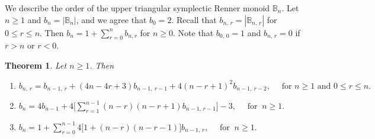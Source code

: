 \documentclass[11pt]{article}
\newtheorem{theorem}{Theorem}[section]
\newcommand{\q}{\quad}
\newcommand{\ges}{\geqslant}
\newcommand{\les}{\leqslant}
\begin{document}
We describe the order of the upper triangular symplectic Renner monoid $\mathbb B_n$. 
Let $n\ges 1$ and $b_n=|\mathbb B_n|$, and we agree that $b_{0}=2$.
%
Recall that $b_{n,\,r}=|\mathbb B_{n,\,r}|$ for $0\les r\les n$. Then $b_n=1+\sum\limits_{r=0}^nb_{n,r}$ for $n\ges 0.$ Note that $b_{0,\,0}=1$ and $b_{n,\,r}=0$ if $r>n$ or $r<0$.  
\begin{theorem} {\label{mainTheorem}}
Let $n\ge 1$. Then
\begin{enumerate}[\upshape 1)]
  \item $b_{n, \,r} = b_{n-1, \,r} + (4n-4r+3)b_{n-1, ~r-1} + 4(n-r+1)^2 b_{n-1, ~r-2},\q\mbox{ for } n\ges 1 \text{ and } 0\les r\les n.$
  \item $b_n = 4b_{n-1} + 4\big[\sum_{r=1}^{n-1} (n-r)(n-r+1)b_{n-1, \,r-1}\big]-3,\q\mbox{ for }~ n\ges 1.$
  \item $b_n=1+\sum_{r=0}^{n-1}4\big[1+(n-r)(n-r-1)\big]b_{n-1,\,r},\q\mbox{ for }~ n\ges 1.$
\end{enumerate}
\end{theorem}
\end{document}
